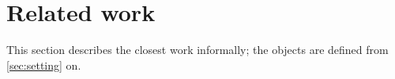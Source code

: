 \section{Related work}\label{sec:related}

This section describes the closest work informally; the objects are defined from \cref{sec:setting} on.

